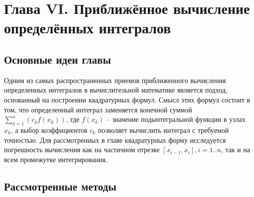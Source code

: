 \newpage
{}
\pagestyle{empty}
\vspace{0.5cm}

\section*{Глава VI. Приближённое вычисление определённых интегралов}

\subsection{Основные идеи главы} 
Одним из самых распространенных приемов приближенного вычисления определенных интегралов в вычислительной математике является подход, основанный на построении квадратурных формул. Смысл этих формул состоит в том, что определенный интеграл заменяется конечной суммой $\sum_{k=1}^{n}(c_k f(x_k))$, где $f(x_k)$ -- значение подынтегральной функции в узлах $x_k$, а выбор коэффициентов $c_k$ позволяет вычислить интеграл с требуемой точностью. Для рассмотренных в главе квадратурных форму исследуется погрешность вычисления как на частичном отрезке $[x_{i-1}, x_i], i = 1..n$, так и на всем промежутке интегрирования.

\begin{landscape}
\newpage
\subsection{Рассмотренные методы}


\end{landscape}
